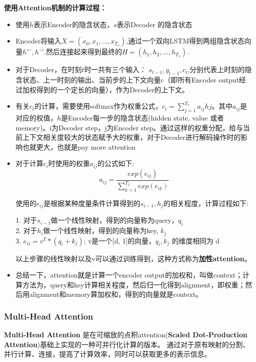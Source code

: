 \documentclass[UTF8,a4paper,10pt]{ctexart}
\begin{document}
    \textbf{使用Attention机制的计算过程：}
      \begin{itemize}
        \item  使用$h$表示Encoder的隐含状态，$s​$表示Decoder 的隐含状态
         
        \item Encoder将输入$X = (x_0, x_1, ...,x_{T_x})$,通过一个双向LSTM得到两组隐含状态向量$h^{\leftarrow}, h^{\rightarrow}$.然后连接起来得到最终的$H=(h_1,h_2, ...,h_{T_x})$.

        \item 对于Decoder，在时刻$t$时一共有三个输入： $s_{t-1}, y_{t-1}, c_t$,分别代表上时刻的隐含状态、上一时刻的输出、当前步的上下文向量c（即所有Encoder output经过加权得到的一个定长的向量），作为Decoder的上下文。

        \item 有关$c_t$的计算，需要使用softmax作为权重公式，$c_i = \sum_{j=1}^{T_x}a_{ij}h{j}$。其中$a_{ij}$是对应的权值，$h$是Encoder每一步的隐含状态(hidden state, value 或者memory)。i为Decoder step，j为Encoder step。通过这样的权重分配，给与当前上下文相关度较大的状态赋予大的权重，对于Decoder进行解码操作时的影响也就更大，也就是pay more attention

        
        \item 对于计算$c_i$时使用的权重$a_{ij}$的公式如下:
             $$
              a_{ij} = \frac{exp(e_{ij})}{\sum_{k=1}^{T_x}{exp(e_{ik})}}
             $$
           
            使用的$e_{ij}$是根据某种度量条件计算得到的$s_{i-1},h_j$的相关程度，计算过程如下:
            \begin{tcolorbox}
                1. 对于$s_{i-1}$做一个线性映射，得到的向量称为query，$q_i$
               \\ 2. 对于$h_i$做一个线性映射，得到的向量称为key, $k_j$
               \\ 3. $e_{ij} = v^T * (q_i + k_j)$; v是一个[d, 1]的向量，$q_i, k_j$ 的维度相同为 d
            \end{tcolorbox}
              以上步骤的线性映射以及v可以通过训练得到，这种方式称为\textbf{加性attention}。
             
          \item 总结一下，attention就是计算一个encoder output的加权和，叫做context；计算方法为，query和key计算相关程度，然后归一化得到alignment，即权重；然后用alignment和memory算加权和，得到的向量就是context。
      \end{itemize}

\subsubsection{Multi-Head Attention}
\textbf{Multi-Head Attention} 是在可缩放的点积attention(\textbf{Scaled Dot-Production Attention})基础上实现的一种可并行化计算的版本。
通过对于原有映射的分割、并行计算、连接，提高了计算效率，同时可以获取更多的表示信息。
\end{document}
